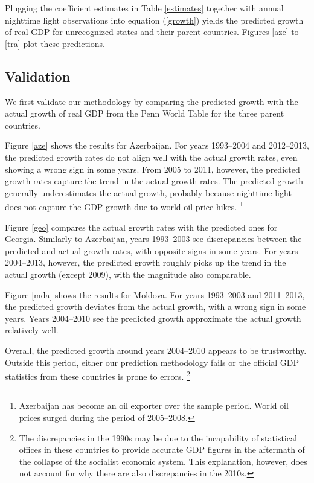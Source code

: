 \documentclass[12pt,a4paper]{article}%
\begin{document}
Plugging the coefficient estimates in Table \ref{estimates} together with annual nighttime light observations into equation (\ref{growth}) yields the predicted growth of real GDP for unrecognized states and their parent countries. 
Figures \ref{aze} to \ref{tra} plot these predictions.

\subsection{Validation}\label{validation}
We first validate our methodology by comparing the predicted growth with the actual growth of real GDP from the Penn World Table for the three parent countries. 

Figure \ref{aze} shows the results for Azerbaijan.
For years 1993--2004 and 2012--2013, the predicted growth rates do not align well with the actual growth rates, even showing a wrong sign in some years. 
From 2005 to 2011, however, the predicted growth rates capture the trend in the actual growth rates. 
The predicted growth generally underestimates the actual growth, probably because nighttime light does not capture the GDP growth due to world oil price hikes.%
\footnote{
	Azerbaijan has become an oil exporter over the sample period. 	
	World oil prices surged during the period of 2005--2008. 
}

Figure \ref{geo} compares the actual growth rates with the predicted ones for Georgia. 
Similarly to Azerbaijan, years 1993--2003 see discrepancies between the predicted and actual growth rates, with opposite signs in some years. 
For years 2004--2013, however, the predicted growth roughly picks up the trend in the actual growth (except 2009), with the magnitude also comparable.

Figure \ref{mda} shows the results for Moldova.
For years 1993--2003 and 2011--2013, the predicted growth deviates from the actual growth, with a wrong sign in some years.
Years 2004--2010 see the predicted growth approximate the actual growth relatively well.

Overall, the predicted growth around years 2004--2010 appears to be trustworthy. 
Outside this period, either our prediction methodology fails or the official GDP statistics from these countries is prone to errors.%
\footnote{
	The discrepancies in the 1990s may be due to the incapability of statistical offices in these countries to provide accurate GDP figures in the aftermath of the collapse of the socialist economic system. 
	This explanation, however, does not account for why there are also discrepancies in the 2010s.
}
\end{document}
